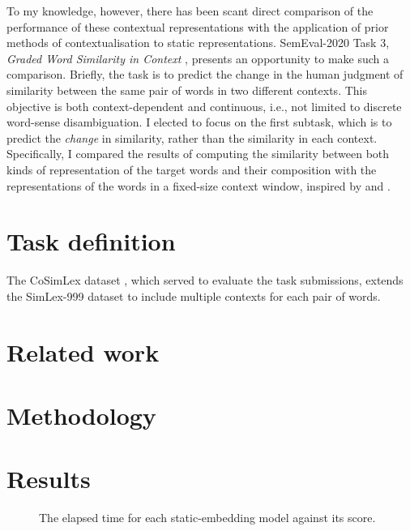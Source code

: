 To my knowledge, however, there has been scant direct comparison of the performance of
these contextual representations with the application of prior methods of
contextualisation to static representations.
SemEval-2020 Task 3, \emph{Graded Word Similarity in Context}
\parencite{Armendariz2020a}, presents an opportunity to make such a comparison.
Briefly, the task is to predict the change in the human judgment of similarity between
the same pair of words in two different contexts.
This objective is both context-dependent and continuous, i.e., not limited to discrete
word-sense disambiguation.
I elected to focus on the first subtask, which is to predict the \emph{change} in
similarity, rather than the similarity in each context.
Specifically, I compared the results of computing the similarity between both kinds of
representation of the target words and their composition with the representations of
the words in a fixed-size context window, inspired by \textcite{Kintsch2001} and
\textcite{Mitchell2008}.

\section{Task definition}

The CoSimLex dataset \parencite{Armendariz2020}, which served to evaluate the task
submissions, extends the SimLex-999 dataset \parencite{Hill2015} to include multiple
contexts for each pair of words.

\section{Related work}

\section{Methodology}

\section{Results}

\begin{figure}
  \centering

  \caption{The elapsed time for each static-embedding model against its score.}
\end{figure}

